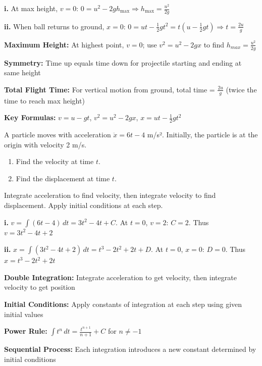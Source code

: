 \begin{solution}
\textbf{i.} At max height, $v = 0$: $0 = u^2 - 2gh_{\max} \Rightarrow h_{\max} = \frac{u^2}{2g}$

\textbf{ii.} When ball returns to ground, $x = 0$: $0 = ut - \frac{1}{2}gt^2 = t(u - \frac{1}{2}gt) \Rightarrow t = \frac{2u}{g}$
\end{solution}

\begin{takeaways}
\item \textbf{Maximum Height:} At highest point, $v = 0$; use $v^2 = u^2 - 2gx$ to find $h_{max} = \frac{u^2}{2g}$
\item \textbf{Symmetry:} Time up equals time down for projectile starting and ending at same height
\item \textbf{Total Flight Time:} For vertical motion from ground, total time = $\frac{2u}{g}$ (twice the time to reach max height)
\item \textbf{Key Formulas:} $v = u - gt$, $v^2 = u^2 - 2gx$, $x = ut - \frac{1}{2}gt^2$
\end{takeaways}

\begin{problem}
A particle moves with acceleration $\ddot{x} = 6t - 4$ m/s². Initially, the particle is at the origin with velocity 2 m/s.

\begin{enumerate}[label=\textbf{\roman*.}]
    \item Find the velocity at time $t$.
    \item Find the displacement at time $t$.
\end{enumerate}
\end{problem}

\begin{hint}
Integrate acceleration to find velocity, then integrate velocity to find displacement. Apply initial conditions at each step.
\end{hint}

\begin{solution}
\textbf{i.} $v = \int (6t-4)\,dt = 3t^2 - 4t + C$. At $t=0$, $v=2$: $C = 2$. Thus $v = 3t^2 - 4t + 2$

\textbf{ii.} $x = \int (3t^2 - 4t + 2)\,dt = t^3 - 2t^2 + 2t + D$. At $t=0$, $x=0$: $D = 0$. Thus $x = t^3 - 2t^2 + 2t$
\end{solution}

\begin{takeaways}
\item \textbf{Double Integration:} Integrate acceleration to get velocity, then integrate velocity to get position
\item \textbf{Initial Conditions:} Apply constants of integration at each step using given initial values
\item \textbf{Power Rule:} $\int t^n\,dt = \frac{t^{n+1}}{n+1} + C$ for $n \neq -1$
\item \textbf{Sequential Process:} Each integration introduces a new constant determined by initial conditions
\end{takeaways}

